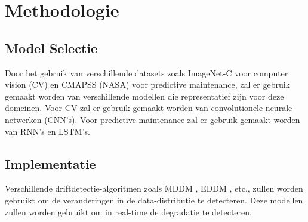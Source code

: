 




\section{Methodologie}%
\label{sec:methodologie}

\subsection{Model Selectie}
Door het gebruik van verschillende datasets zoals ImageNet-C \autocite{Hendrycks2019} voor computer vision (CV) en CMAPSS (NASA) \autocite{Saxena2008} voor predictive maintenance, zal er gebruik gemaakt worden van verschillende modellen die representatief zijn voor deze domeinen. Voor CV zal er gebruik gemaakt worden van convolutionele neurale netwerken (CNN's). Voor predictive maintenance zal er gebruik gemaakt worden van RNN's en LSTM's.

\subsection{Implementatie}
Verschillende driftdetectie-algoritmen zoals MDDM \autocite{Pesaranghader2018}, EDDM \autocite{baena2006early}, etc., zullen worden gebruikt om de veranderingen in de data-distributie te detecteren. Deze modellen zullen worden gebruikt om in real-time de degradatie te detecteren.

